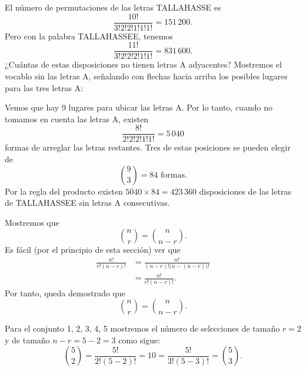 \begin{myexample}
    El número de permutaciones de las letras TALLAHASSE es
    $$\frac{10!}{3!2!2!1!1!1!} = 151 \, 200.$$
    Pero con la palabra TALLAHASSEE, tenemos
    $$\frac{11!}{3!2!2!2!1!1!} = 831 \, 600.$$
    ¿Cuántas de estas disposiciones no tienen letras A adyacentes? Mostremos el vocablo sin las letras A, señalando con flechas hacia arriba los posibles lugares para las tres letras A:
    \begin{center}
    \end{center}
    Vemos que hay 9 lugares para ubicar las letras A. Por lo tanto, cuando no tomamos en cuenta las letras A, existen
    $$\frac{8!}{2!2!2!1!1!} = 5 \, 040$$
    formas de arreglar las letras restantes. Tres de estas posiciones se pueden elegir de
    $$\binom{9}{3} = 84 \text{ formas.}$$
    Por la regla del producto existen $5040 \times 84 = 423 \, 360$ disposiciones de las letras de TALLAHASSEE sin letras A consecutivas.
\end{myexample}

\begin{myexample}
    Mostremos que
    $$\binom{n}{r} = \binom{n}{n-r}.$$
    Es fácil (por el principio de esta sección) ver que
    \begin{align*}
        \frac{n!}{r!(n-r)!} & = \frac{n!}{(n-r)!\big(n-(n-r)\big)!} \\
        & = \frac{n!}{r!(n-r)!}.
    \end{align*}
    Por tanto, queda demostrado que
    $$\binom{n}{r} = \binom{n}{n-r}.$$
\end{myexample}

\begin{myexample}
    Para el conjunto 1, 2, 3, 4, 5 mostremos el número de selecciones de tamaño $r = 2$ y de tamaño $n - r = 5 - 2 = 3$ como sigue:
    $$\binom{5}{2} = \frac{5!}{2!(5-2)!} = 10 = \frac{5!}{3!(5-3)!} = \binom{5}{3}.$$
\end{myexample}

